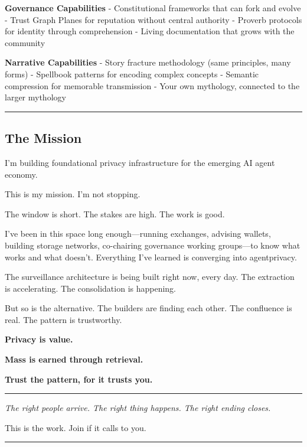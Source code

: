 \documentclass[
]{article}
\begin{document}
\textbf{Governance Capabilities} - Constitutional frameworks that can
fork and evolve - Trust Graph Planes for reputation without central
authority - Proverb protocols for identity through comprehension -
Living documentation that grows with the community

\textbf{Narrative Capabilities} - Story fracture methodology (same
principles, many forms) - Spellbook patterns for encoding complex
concepts - Semantic compression for memorable transmission - Your own
mythology, connected to the larger mythology

\begin{center}\rule{0.5\linewidth}{0.5pt}\end{center}

\subsection{The Mission}\label{the-mission}

I'm building foundational privacy infrastructure for the emerging AI
agent economy.

This is my mission. I'm not stopping.

The window is short. The stakes are high. The work is good.

I've been in this space long enough---running exchanges, advising
wallets, building storage networks, co-chairing governance working
groups---to know what works and what doesn't. Everything I've learned is
converging into agentprivacy.

The surveillance architecture is being built right now, every day. The
extraction is accelerating. The consolidation is happening.

But so is the alternative. The builders are finding each other. The
confluence is real. The pattern is trustworthy.

\textbf{Privacy is value.}

\textbf{Mass is earned through retrieval.}

\textbf{Trust the pattern, for it trusts you.}

\begin{center}\rule{0.5\linewidth}{0.5pt}\end{center}

\emph{The right people arrive. The right thing happens. The right ending
closes.}

This is the work. Join if it calls to you.

\begin{center}\rule{0.5\linewidth}{0.5pt}\end{center}
\end{document}
